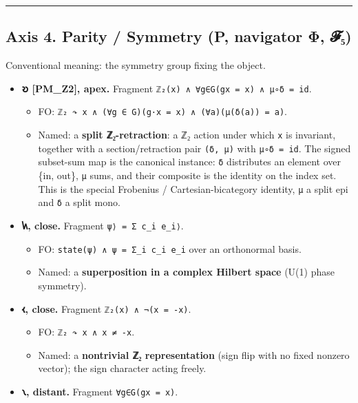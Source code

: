 \documentclass[12pt,a4paper]{article}
\begin{document}
\begin{center}\rule{0.5\linewidth}{0.5pt}\end{center}

\hypertarget{axis-4.-parity-symmetry-p-navigator-ux3c6-ux1d4d5ux2085}{%
\subsection{Axis 4. Parity / Symmetry (P, navigator Φ,
𝓕₅)}\label{axis-4.-parity-symmetry-p-navigator-ux3c6-ux1d4d5ux2085}}

Conventional meaning: the symmetry group fixing the object.

\begin{itemize}
\tightlist
\item
  \textbf{𐑹 {[}PM\_Z2{]}, apex.} Fragment
  \texttt{ℤ₂(x)\ ∧\ ∀g∈G(gx\ =\ x)\ ∧\ μ∘δ\ =\ id}.

  \begin{itemize}
  \tightlist
  \item
    FO:
    \texttt{ℤ₂\ ↷\ x\ ∧\ (∀g\ ∈\ G)(g·x\ =\ x)\ ∧\ (∀a)(μ(δ(a))\ =\ a)}.
  \item
    Named: a \textbf{split ℤ₂-retraction}: a ℤ₂ action under which
    \texttt{x} is invariant, together with a section/retraction pair
    \texttt{(δ,\ μ)} with \texttt{μ∘δ\ =\ id}. The signed subset-sum map
    is the canonical instance: \texttt{δ} distributes an element over
    \{in, out\}, \texttt{μ} sums, and their composite is the identity on
    the index set. This is the special Frobenius / Cartesian-bicategory
    identity, \texttt{μ} a split epi and \texttt{δ} a split mono.
  \end{itemize}
\item
  \textbf{𐑿, close.} Fragment
  \texttt{\textbar{}ψ⟩\ =\ Σ\ c\_i\ \textbar{}e\_i⟩}.

  \begin{itemize}
  \tightlist
  \item
    FO: \texttt{state(ψ)\ ∧\ ψ\ =\ Σ\_i\ c\_i\ e\_i} over an orthonormal
    basis.
  \item
    Named: a \textbf{superposition in a complex Hilbert space} (U(1)
    phase symmetry).
  \end{itemize}
\item
  \textbf{𐑬, close.} Fragment \texttt{ℤ₂(x)\ ∧\ ¬(x\ =\ -x)}.

  \begin{itemize}
  \tightlist
  \item
    FO: \texttt{ℤ₂\ ↷\ x\ ∧\ x\ ≠\ -x}.
  \item
    Named: a \textbf{nontrivial ℤ₂ representation} (sign flip with no
    fixed nonzero vector); the sign character acting freely.
  \end{itemize}
\item
  \textbf{𐑯, distant.} Fragment \texttt{∀g∈G(gx\ =\ x)}.


\end{itemize}
\end{document}

